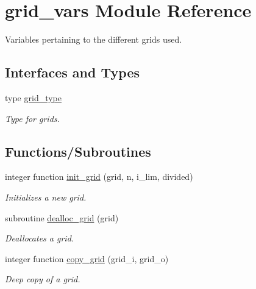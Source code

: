 \hypertarget{namespacegrid__vars}{}\section{grid\+\_\+vars Module Reference}
\label{namespacegrid__vars}


Variables pertaining to the different grids used.  


\subsection*{Interfaces and Types}
\begin{DoxyCompactItemize}
\item 
type \hyperlink{structgrid__vars_1_1grid__type}{grid\+\_\+type}
\begin{DoxyCompactList}\small\item\em Type for grids. \end{DoxyCompactList}\end{DoxyCompactItemize}
\subsection*{Functions/\+Subroutines}
\begin{DoxyCompactItemize}
\item 
integer function \hyperlink{namespacegrid__vars_aa0d888796fd875e9024443e46eeb11f8}{init\+\_\+grid} (grid, n, i\+\_\+lim, divided)
\begin{DoxyCompactList}\small\item\em Initializes a new grid. \end{DoxyCompactList}\item 
subroutine \hyperlink{namespacegrid__vars_abc8ea59261a1e773754afebdb13276f9}{dealloc\+\_\+grid} (grid)
\begin{DoxyCompactList}\small\item\em Deallocates a grid. \end{DoxyCompactList}\item 
integer function \hyperlink{namespacegrid__vars_a6fa9a9920f1a700d50075bc9c291a247}{copy\+\_\+grid} (grid\+\_\+i, grid\+\_\+o)
\begin{DoxyCompactList}\small\item\em Deep copy of a grid. \end{DoxyCompactList}\end{DoxyCompactItemize}
